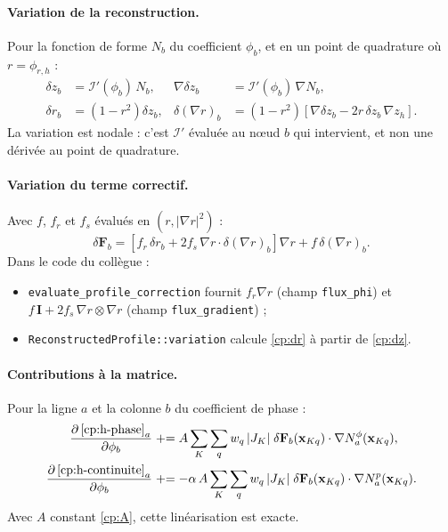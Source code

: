 \paragraph{Variation de la reconstruction.} Pour la fonction de forme $N_b$ du coefficient $\phi_b$, et en un point de quadrature où $r=\phi_{r,h}$ :
\begin{align}
  \delta z_b &= \mathcal{I}'(\phi_b)\,N_b,
  &
  \nabla\delta z_b &= \mathcal{I}'(\phi_b)\,\nabla N_b,
  \label{cp:dz}\\
  \delta r_b &= \left(1-r^{2}\right)\delta z_b,
  &
  \delta(\nabla r)_b &= \left(1-r^{2}\right)\left[\nabla\delta z_b - 2r\,\delta z_b\,\nabla z_h\right].
  \label{cp:dr}
\end{align}
La variation est nodale : c'est $\mathcal{I}'$ évaluée au nœud $b$ qui intervient, et non une dérivée au point de quadrature.

\paragraph{Variation du terme correctif.} Avec $f$, $f_r$ et $f_s$ évalués en $\left(r,|\nabla r|^{2}\right)$ :
\begin{equation}\label{cp:dF}
  \delta\mathbf{F}_b
  = \left[f_r\,\delta r_b + 2f_s\,\nabla r\cdot\delta(\nabla r)_b\right]\nabla r
  + f\,\delta(\nabla r)_b .
\end{equation}
Dans le code du collègue :
\begin{itemize}
  \item \texttt{evaluate\_profile\_correction} fournit $f_r\nabla r$ (champ \texttt{flux\_phi}) et $f\,\mathbf{I}+2f_s\,\nabla r\otimes\nabla r$ (champ \texttt{flux\_gradient}) ;
  \item \texttt{ReconstructedProfile::variation} calcule \eqref{cp:dr} à partir de \eqref{cp:dz}.
\end{itemize}

\paragraph{Contributions à la matrice.} Pour la ligne $a$ et la colonne $b$ du coefficient de phase :
\begin{align}
  \frac{\partial\,\eqref{cp:h-phase}_a}{\partial\phi_b} &\mathrel{+}=
    A\sum_{K}\sum_{q} w_{q}\,|J_K|\;\delta\mathbf{F}_b(\mathbf{x}_{Kq})\cdot\nabla N^{\phi}_a(\mathbf{x}_{Kq}),
  \label{cp:jac-phase}\\
  \frac{\partial\,\eqref{cp:h-continuite}_a}{\partial\phi_b} &\mathrel{+}=
    -\alpha\,A\sum_{K}\sum_{q} w_{q}\,|J_K|\;\delta\mathbf{F}_b(\mathbf{x}_{Kq})\cdot\nabla N^{p}_a(\mathbf{x}_{Kq}).
  \label{cp:jac-continuite}
\end{align}
Avec $A$ constant \eqref{cp:A}, cette linéarisation est exacte.

